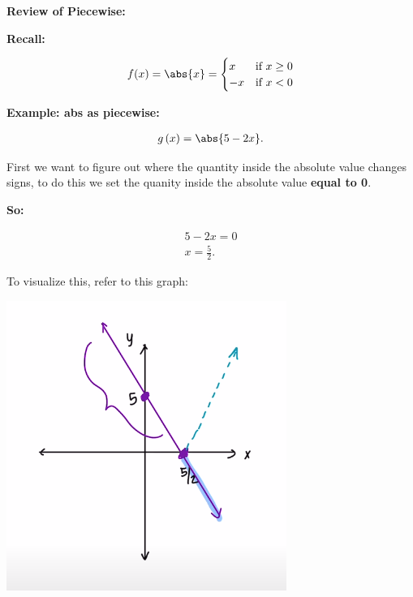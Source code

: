 \documentclass{report}
\begin{document}
   \bigbreak \noindent \textbf{} 
   
   \bigbreak \noindent \bigbreak \noindent 
   \begin{large}
      \textbf{Review of Piecewise:} 
   \end{large}

   \bigbreak \noindent \bigbreak \noindent 
   \textbf{Recall: }
  
   \bigbreak \noindent 
   \begin{equation}
    f(x)= \abs{x} =
        \begin{cases}
            x & \text{if } x \geq 0 \\ 
            -x & \text{if } x < 0 
        \end{cases}
    \end{equation}

    \bigbreak \noindent 
    \begin{large}
       \textbf{Example: abs as piecewise:} 
    \end{large}

    \begin{align*}
        g \left(x\right) = \abs{5-2x}
    .\end{align*}

    \bigbreak \noindent 
    First we want to figure out where the quantity inside the absolute value changes signs,
    to do this we set the quanity inside the absolute value \textbf{equal to 0}.
    
    \bigbreak \noindent 
    \textbf{So:}

    \begin{align*}
        5-2x=0 \\
        x= \frac{5}{2} 
    .\end{align*}

    \bigbreak \noindent 
    To visualize this, refer to this graph:

    \bigbreak \noindent 
    \begin{center}
        \includegraphics[scale=0.5]{../images/gr.png  }
    \end{center}
\end{document}
